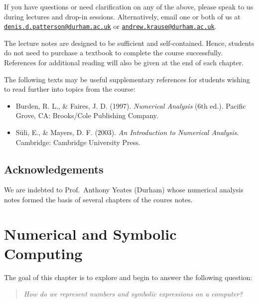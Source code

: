 \documentclass[
  letterpaper,
  DIV=11,
  numbers=noendperiod]{scrreprt}
\providecommand{\tightlist}{%
  \setlength{\itemsep}{0pt}\setlength{\parskip}{0pt}}
\begin{document}

If you have questions or need clarification on any of the above, please
speak to us during lectures and drop-in sessions. Alternatively, email
one or both of us at
\href{mailto:denis.d.patterson@durham.ac.uk}{\nolinkurl{denis.d.patterson@durham.ac.uk}}
or
\href{mailto:andrew.krause@durham.ac.uk}{\nolinkurl{andrew.krause@durham.ac.uk}}.

The lecture notes are designed to be sufficient and self-contained.
Hence, students do not need to purchase a textbook to complete the
course successfully. References for additional reading will also be
given at the end of each chapter.

The following texts may be useful supplementary references for students
wishing to read further into topics from the course:

\begin{itemize}
\tightlist
\item
  Burden, R. L., \& Faires, J. D. (1997). \emph{Numerical Analysis} (6th
  ed.). Pacific Grove, CA: Brooks/Cole Publishing Company.
\item
  Süli, E., \& Mayers, D. F. (2003). \emph{An Introduction to Numerical
  Analysis}. Cambridge: Cambridge University Press.
\end{itemize}

\section*{Acknowledgements}\label{acknowledgements}


We are indebted to Prof.~Anthony Yeates (Durham) whose numerical
analysis notes formed the basis of several chapters of the coures notes.


\chapter{Numerical and Symbolic
Computing}\label{numerical-and-symbolic-computing}

The goal of this chapter is to explore and begin to answer the following
question:

\begin{quote}
\emph{How do we represent numbers and symbolic expressions on a
computer?}
\end{quote}
\end{document}
